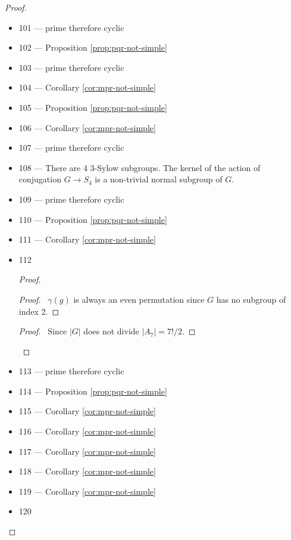 \begin{proof}
\begin{itemize}
\item 101 --- prime therefore cyclic
\item 102 --- Proposition \ref{prop:pqr-not-simple}
\item 103 --- prime therefore cyclic
\item 104 --- Corollary \ref{cor:mpr-not-simple}
\item 105 --- Proposition \ref{prop:pqr-not-simple}
\item 106 --- Corollary \ref{cor:mpr-not-simple}
\item 107 --- prime therefore cyclic
\item 108 --- There are 4 3-Sylow subgroups. The kernel of the action of conjugation $G \rightarrow S_4$ is a non-trivial normal subgroup of $G$.
\item 109 --- prime therefore cyclic
\item 110 --- Proposition \ref{prop:pqr-not-simple}
\item 111 --- Corollary \ref{cor:mpr-not-simple}
\item 112
\begin{proof}
	\begin{proof}
		\pf\ $\gamma(g)$ is always an even permutation since $G$ has no subgroup of index 2.
	\end{proof}
	\begin{proof}
		\pf\ Since $|G|$ does not divide $|A_7| = 7!/2$.
	\end{proof}
	\qedstep
\end{proof}
\item 113 --- prime therefore cyclic
\item 114 --- Proposition \ref{prop:pqr-not-simple}
\item 115 --- Corollary \ref{cor:mpr-not-simple}
\item 116 --- Corollary \ref{cor:mpr-not-simple}
\item 117 --- Corollary \ref{cor:mpr-not-simple}
\item 118 --- Corollary \ref{cor:mpr-not-simple}
\item 119 --- Corollary \ref{cor:mpr-not-simple}
\item 120

\end{itemize}
\end{proof}
